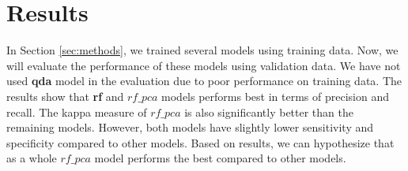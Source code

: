 \documentclass[]{article}
\begin{document}
\section{Results}
\label{sec:results}

In Section \ref{sec:methods}, we trained several models using training
data. Now, we will evaluate the performance of these models using
validation data. We have not used \textbf{qda} model in the evaluation
due to poor performance on training data. The results show that
\textbf{rf} and \textbf{$rf\_pca$} models performs best in
terms of precision and recall. The kappa measure of
\textbf{$rf\_pca$} is also significantly better than the
remaining models. However, both models have slightly lower sensitivity
and specificity compared to other models. Based on results, we can
hypothesize that as a whole \textbf{$rf\_pca$} model
performs the best compared to other models.
\end{document}

